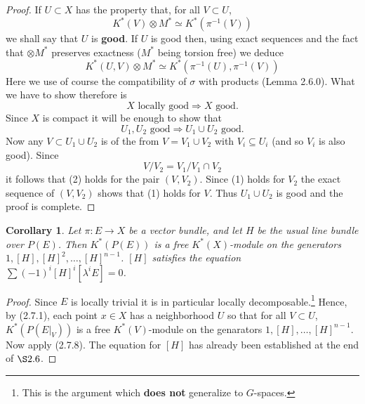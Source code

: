 \documentclass[leqno]{book}
\numberwithin{equation}{section}
\newtheorem{corollary}[theorem]{Corollary}
\theoremstyle{definition}
\renewcommand{\emph}{\textbf}
\begin{document}
            \begin{proof}
              If $U \subset X$ has the property that, for all $V \subset U$, 
              \begin{equation*}
                \tag{1}
                K^{*}(V)\otimes M^{*}\simeq K^{*}(\pi^{-1}(V))
              \end{equation*}
              we shall say that $U$ is \emph{good}. If $U$ is good then, using exact sequences and the fact that $\otimes M^{*}$ preserves exactness ($M^{*}$ being torsion free) we deduce
              \begin{equation*}
                \tag{2}
                K^{*}(U,V)\otimes M^{*}\simeq K^{*}(\pi^{-1}(U),\pi^{-1}(V))
              \end{equation*}
              Here we use of course the compatibility of $\sigma$ with products (Lemma 2.6.0). What we have to show therefore is 
              \begin{equation*}
                X \text{ locally good}\Rightarrow X\text{ good.}
              \end{equation*}
              Since $X$ is compact it will be enough to show that
              \begin{equation*}
                U_1,U_2 \text{ good}\Rightarrow U_1\cup U_2 \text{ good.}
              \end{equation*}
              Now any $V \subset U_1\cup U_2$ is of the from $V=V_1\cup V_2$ with $V_{i} \subseteq U_{i}$ (and so $V_{i}$ is also good). Since
              \begin{equation*}
                V/V_2=V_1/V_1\cap V_2
              \end{equation*}
              it follows that (2) holds for the pair $(V,V_2)$. Since (1) holds for $V_2$ the exact sequence of $(V,V_2)$ shows that (1) holds for $V$. Thus $U_1\cup U_2$ is good and the proof is complete.
            \end{proof}

            \begin{corollary}
              Let $\pi:E\to X$ be a vector bundle, and let $H$ be the usual line bundle over $P(E)$. Then $K^{*}(P(E))$ is a free $K^{*}(X)$-module on the generators $1,[H],[H]^{2}, \ldots ,[H]^{n-1}$. $[H]$ satisfies the equation $\sum (-1)^{i}[H]^{i}[\lambda^{i}E]=0$.
            \end{corollary}

            \begin{proof}
              Since $E$ is locally trivial it is in particular locally decomposable.\footnote[1]{This is the argument which \emph{does not} generalize to $G$-spaces.} Hence, by (2.7.1), each point $x \in X$ has a neighborhood $U$ so that for all $V \subset U$, $K^{*}(P(E|_{V}))$ is a free $K^{*}(V)$-module on the genarators $1,[H], \ldots ,[H]^{n-1}$. Now apply (2.7.8). The equation for $[H]$ has already been established at the end of $\S 2.6$.
            \end{proof}
\end{document}
